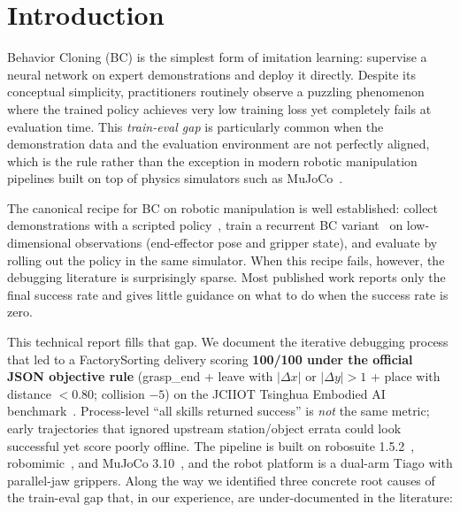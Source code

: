 \section{Introduction}
\label{sec:introduction}

Behavior Cloning (BC) is the simplest form of imitation learning: supervise a neural network on expert demonstrations and deploy it directly. Despite its conceptual simplicity, practitioners routinely observe a puzzling phenomenon where the trained policy achieves very low training loss yet completely fails at evaluation time. This \emph{train-eval gap} is particularly common when the demonstration data and the evaluation environment are not perfectly aligned, which is the rule rather than the exception in modern robotic manipulation pipelines built on top of physics simulators such as MuJoCo~\cite{todorov2012mujoco}.

The canonical recipe for BC on robotic manipulation is well established: collect demonstrations with a scripted policy~\cite{robosuite}, train a recurrent BC variant~\cite{robomimic} on low-dimensional observations (end-effector pose and gripper state), and evaluate by rolling out the policy in the same simulator. When this recipe fails, however, the debugging literature is surprisingly sparse. Most published work reports only the final success rate and gives little guidance on what to do when the success rate is zero.

This technical report fills that gap. We document the iterative debugging process that led to a FactorySorting delivery scoring \textbf{100/100 under the official JSON objective rule} (grasp\_end + leave with $|\Delta x|$ or $|\Delta y|>1$ + place with distance $<0.80$; collision $-5$) on the JCIIOT Tsinghua Embodied AI benchmark~\cite{jciiot2026}. Process-level ``all skills returned success'' is \emph{not} the same metric; early trajectories that ignored upstream station/object errata could look successful yet score poorly offline. The pipeline is built on robosuite 1.5.2~\cite{robosuite}, robomimic~\cite{robomimic}, and MuJoCo 3.10~\cite{todorov2012mujoco}, and the robot platform is a dual-arm Tiago with parallel-jaw grippers. Along the way we identified three concrete root causes of the train-eval gap that, in our experience, are under-documented in the literature:

